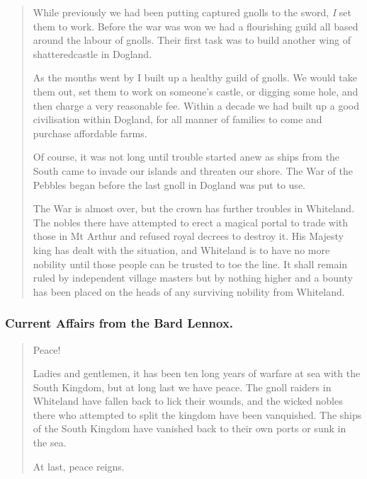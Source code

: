 \begin{multicols}{2}
\begin{quotation}
	While previously we had been putting captured gnolls to the sword, \emph{I} set them to work.
	Before the war was won we had a flourishing guild all based around the labour of gnolls.
	Their first task was to build another wing of \gls{shatteredcastle} in Dogland.

	As the months went by I built up a healthy guild of gnolls.
	We would take them out, set them to work on someone's castle, or digging some hole, and then charge a very reasonable fee.
	Within a decade we had built up a good civilisation within Dogland, for all manner of families to come and purchase affordable farms.

	Of course, it was not long until trouble started anew as ships from the South came to invade our islands and threaten our shore.
	The War of the Pebbles began before the last gnoll in Dogland was put to use.

	The War is almost over, but the crown has further troubles in Whiteland.
	The nobles there have attempted to erect a magical portal to trade with those in Mt Arthur and refused royal decrees to destroy it.
	His Majesty \gls{king} has dealt with the situation, and Whiteland is to have no more nobility until those people can be trusted to toe the line.
	It shall remain ruled by independent village masters but by nothing higher and a bounty has been placed on the heads of any surviving nobility from Whiteland.

\end{quotation}

\subsubsection{Current Affairs from the Bard Lennox.}

\begin{quotation}

	Peace!

	Ladies and gentlemen, it has been ten long years of warfare at sea with the South Kingdom, but at long last we have peace.
	The gnoll raiders in Whiteland have fallen back to lick their wounds, and the wicked nobles there who attempted to split the kingdom have been vanquished.
	The ships of the South Kingdom have vanished back to their own ports or sunk in the sea.

	At last, peace reigns.

\end{quotation}

\begin{quotation}


\end{quotation}
\end{multicols}
